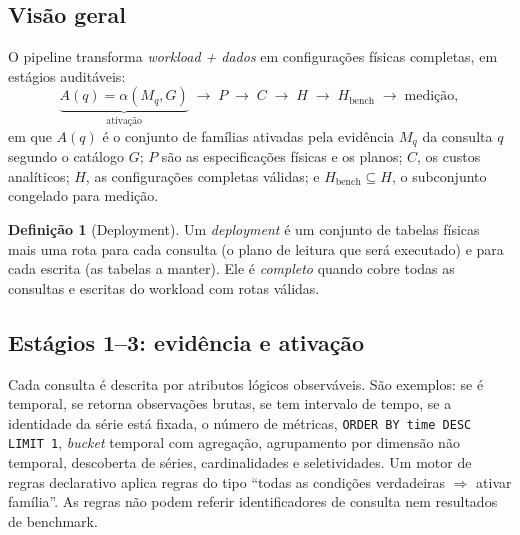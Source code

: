 \documentclass[10pt,a4paper,twoside]{article}
\theoremstyle{definition}\newtheorem{definicao}{Definição}
\begin{document}
\subsection{Visão geral}
O pipeline transforma \emph{workload + dados} em configurações físicas completas, em estágios auditáveis:
\[
\underbrace{A(q)=\alpha(M_q, G)}_{\text{ativação}} \;\rightarrow\; P \;\rightarrow\; C \;\rightarrow\; H \;\rightarrow\; H_{\text{bench}} \;\rightarrow\; \text{medição},
\]
em que $A(q)$ é o conjunto de famílias ativadas pela evidência $M_q$ da consulta $q$ segundo o catálogo $G$; $P$ são as especificações físicas e os planos; $C$, os custos analíticos; $H$, as configurações completas válidas; e $H_{\text{bench}}\subseteq H$, o subconjunto congelado para medição.

\begin{definicao}[Deployment]
Um \emph{deployment} é um conjunto de tabelas físicas mais uma rota para cada consulta (o plano de leitura que será executado) e para cada escrita (as tabelas a manter). Ele é \emph{completo} quando cobre todas as consultas e escritas do workload com rotas válidas.
\end{definicao}

\subsection{Estágios 1--3: evidência e ativação}
Cada consulta é descrita por atributos lógicos observáveis. São exemplos: se é temporal, se retorna observações brutas, se tem intervalo de tempo, se a identidade da série está fixada, o número de métricas, \texttt{ORDER BY time DESC LIMIT 1}, \emph{bucket} temporal com agregação, agrupamento por dimensão não temporal, descoberta de séries, cardinalidades e seletividades. Um motor de regras declarativo aplica regras do tipo ``todas as condições verdadeiras $\Rightarrow$ ativar família''. As regras não podem referir identificadores de consulta nem resultados de benchmark.
\end{document}

